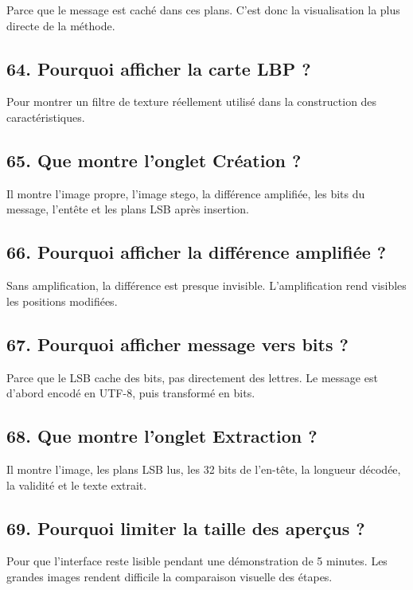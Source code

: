 \documentclass[11pt,a4paper]{article}
\begin{document}
Parce que le message est caché dans ces plans. C'est donc la visualisation la plus directe de la méthode.

\subsection{64. Pourquoi afficher la carte LBP ?}

Pour montrer un filtre de texture réellement utilisé dans la construction des caractéristiques.

\subsection{65. Que montre l'onglet Création ?}

Il montre l'image propre, l'image stego, la différence amplifiée, les bits du message, l'entête et les plans LSB après insertion.

\subsection{66. Pourquoi afficher la différence amplifiée ?}

Sans amplification, la différence est presque invisible. L'amplification rend visibles les positions modifiées.

\subsection{67. Pourquoi afficher message vers bits ?}

Parce que le LSB cache des bits, pas directement des lettres. Le message est d'abord encodé en UTF-8, puis transformé en bits.

\subsection{68. Que montre l'onglet Extraction ?}

Il montre l'image, les plans LSB lus, les 32 bits de l'en-tête, la longueur décodée, la validité et le texte extrait.

\subsection{69. Pourquoi limiter la taille des aperçus ?}

Pour que l'interface reste lisible pendant une démonstration de 5 minutes. Les grandes images rendent difficile la comparaison visuelle des étapes.
\end{document}
